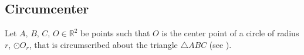 {\color{cyan}
\begin{comment}{}
We can determine if two lines are parallel by determining the angle $\theta$
between them, and verifying it is equal to $0$.
%
\begin{equation}\label{eq:angle.vectors.2}
  \theta = \arccos \frac{\vec{u} \cdot \vec{v}}%
                        {||\vec{u}|| \cdot ||\vec{v}||},~%
  \theta \in \mathbb{R}.
\end{equation}
%
Having $\vec{v} = \lambda \vec{u}, \lambda \in \mathbb{R}$, and knowing
%
\begin{equation}\label{eq:dot.vector.2.same}
  \vec{u} \cdot \vec{u} = ||\vec{u}||^2,
\end{equation}
%
then \eqref{eq:angle.vectors.2} becomes
%
\[
  \begin{split}
    \theta & = \arccos \frac{\vec{u} \cdot \lambda\vec{u}}%
                            {||\vec{u}|| \cdot ||\lambda\vec{u}||}\\%
           & = \arccos \frac{\lambda\vec{u} \cdot \vec{u}}%
                            {\lambda||\vec{u}||^2}\\%
           & = 0.
  \end{split}
\]
%
This means that we can compute a directional vector for $CS$ from the line $AB$,
where $\vec{u} = B - A$.  Finally, we can obtain the equation for the parallel
line $CS$
\end{comment}
}

\subsection{Circumcenter}
\label{sec:intro.examples.circumcenter}

Let $A,\,B,\,C,\,O \in \mathbb{R}^2$ be points such that $O$ is the center point
of a circle of radius $r$, $\odot O_r$, that is circumscribed about the triangle
$\triangle ABC$ (see ).

